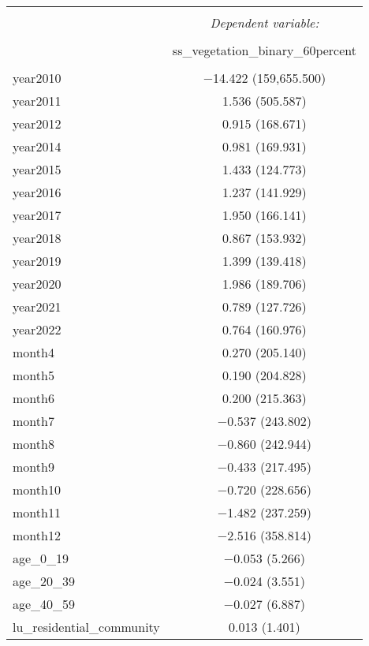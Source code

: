 \begin{table}[!htbp] \centering 
  \caption{} 
  \label{} 
\small 
\begin{tabular}{@{\extracolsep{1pt}}lc} 
\\[-1.8ex]\hline 
\hline \\[-1.8ex] 
 & \multicolumn{1}{c}{\textit{Dependent variable:}} \\ 
\cline{2-2} 
\\[-1.8ex] & ss\_vegetation\_binary\_60percent \\ 
\hline \\[-1.8ex] 
 year2010 & $-$14.422 (159,655.500) \\ 
  year2011 & 1.536 (505.587) \\ 
  year2012 & 0.915 (168.671) \\ 
  year2014 & 0.981 (169.931) \\ 
  year2015 & 1.433 (124.773) \\ 
  year2016 & 1.237 (141.929) \\ 
  year2017 & 1.950 (166.141) \\ 
  year2018 & 0.867 (153.932) \\ 
  year2019 & 1.399 (139.418) \\ 
  year2020 & 1.986 (189.706) \\ 
  year2021 & 0.789 (127.726) \\ 
  year2022 & 0.764 (160.976) \\ 
  month4 & 0.270 (205.140) \\ 
  month5 & 0.190 (204.828) \\ 
  month6 & 0.200 (215.363) \\ 
  month7 & $-$0.537 (243.802) \\ 
  month8 & $-$0.860 (242.944) \\ 
  month9 & $-$0.433 (217.495) \\ 
  month10 & $-$0.720 (228.656) \\ 
  month11 & $-$1.482 (237.259) \\ 
  month12 & $-$2.516 (358.814) \\ 
  age\_0\_19 & $-$0.053 (5.266) \\ 
  age\_20\_39 & $-$0.024 (3.551) \\ 
  age\_40\_59 & $-$0.027 (6.887) \\ 
  lu\_residential\_community & 0.013 (1.401) \\ 

\end{tabular}
\end{table}
